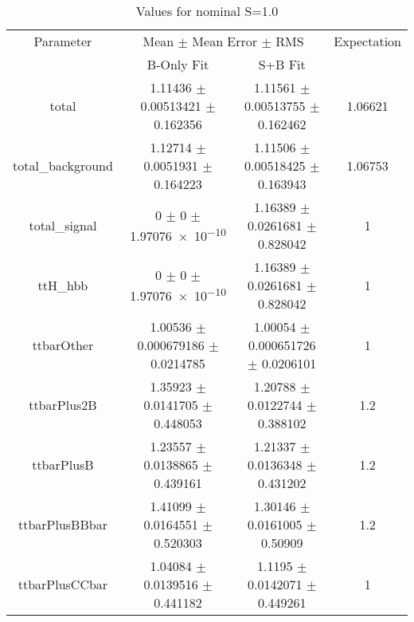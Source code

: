 \begin{table}
\centering
\caption{Values for nominal S=1.0}
\begin{tabular}{cccc}
\toprule
Parameter & \multicolumn{2}{c}{Mean $\pm$ Mean Error $\pm$ RMS} & Expectation\\
 & B-Only Fit & S+B Fit & \\
\midrule
total & \num{1.11436} $\pm$ \num{0.00513421} $\pm$ \num{0.162356} & \num{1.11561} $\pm$ \num{0.00513755} $\pm$ \num{0.162462} & \num{1.06621}\\
total\_background & \num{1.12714} $\pm$ \num{0.0051931} $\pm$ \num{0.164223} & \num{1.11506} $\pm$ \num{0.00518425} $\pm$ \num{0.163943} & \num{1.06753}\\
total\_signal & \num{0} $\pm$ \num{0} $\pm$ \num{1.97076e-10} & \num{1.16389} $\pm$ \num{0.0261681} $\pm$ \num{0.828042} & \num{1}\\
ttH\_hbb & \num{0} $\pm$ \num{0} $\pm$ \num{1.97076e-10} & \num{1.16389} $\pm$ \num{0.0261681} $\pm$ \num{0.828042} & \num{1}\\
ttbarOther & \num{1.00536} $\pm$ \num{0.000679186} $\pm$ \num{0.0214785} & \num{1.00054} $\pm$ \num{0.000651726} $\pm$ \num{0.0206101} & \num{1}\\
ttbarPlus2B & \num{1.35923} $\pm$ \num{0.0141705} $\pm$ \num{0.448053} & \num{1.20788} $\pm$ \num{0.0122744} $\pm$ \num{0.388102} & \num{1.2}\\
ttbarPlusB & \num{1.23557} $\pm$ \num{0.0138865} $\pm$ \num{0.439161} & \num{1.21337} $\pm$ \num{0.0136348} $\pm$ \num{0.431202} & \num{1.2}\\
ttbarPlusBBbar & \num{1.41099} $\pm$ \num{0.0164551} $\pm$ \num{0.520303} & \num{1.30146} $\pm$ \num{0.0161005} $\pm$ \num{0.50909} & \num{1.2}\\
ttbarPlusCCbar & \num{1.04084} $\pm$ \num{0.0139516} $\pm$ \num{0.441182} & \num{1.1195} $\pm$ \num{0.0142071} $\pm$ \num{0.449261} & \num{1}\\
\bottomrule
\end{tabular}
\end{table}